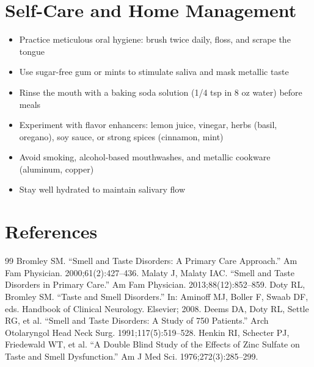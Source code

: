 \section*{Self-Care and Home Management}
\begin{itemize}
  \item Practice meticulous oral hygiene: brush twice daily, floss, and scrape the tongue
  \item Use sugar-free gum or mints to stimulate saliva and mask metallic taste
  \item Rinse the mouth with a baking soda solution (1/4 tsp in 8 oz water) before meals
  \item Experiment with flavor enhancers: lemon juice, vinegar, herbs (basil, oregano), soy sauce, or strong spices (cinnamon, mint)
  \item Avoid smoking, alcohol-based mouthwashes, and metallic cookware (aluminum, copper)
  \item Stay well hydrated to maintain salivary flow
\end{itemize}

\section*{References}
\begin{thebibliography}{99}
 Bromley SM. ``Smell and Taste Disorders: A Primary Care Approach.'' Am Fam Physician. 2000;61(2):427--436.
 Malaty J, Malaty IAC. ``Smell and Taste Disorders in Primary Care.'' Am Fam Physician. 2013;88(12):852--859.
 Doty RL, Bromley SM. ``Taste and Smell Disorders.'' In: Aminoff MJ, Boller F, Swaab DF, eds. Handbook of Clinical Neurology. Elsevier; 2008.
 Deems DA, Doty RL, Settle RG, et al. ``Smell and Taste Disorders: A Study of 750 Patients.'' Arch Otolaryngol Head Neck Surg. 1991;117(5):519--528.
 Henkin RI, Schecter PJ, Friedewald WT, et al. ``A Double Blind Study of the Effects of Zinc Sulfate on Taste and Smell Dysfunction.'' Am J Med Sci. 1976;272(3):285--299.
\end{thebibliography}
